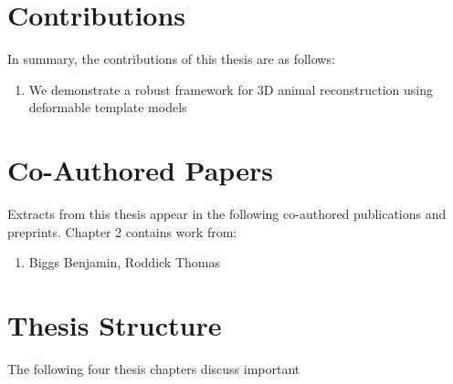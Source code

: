 \section{Contributions}  %
In summary, the contributions of this thesis are as follows:
\begin{enumerate}
    \item We demonstrate a robust framework for 3D animal reconstruction using deformable template models
\end{enumerate}

\section{Co-Authored Papers}  %

Extracts from this thesis appear in the following co-authored publications and preprints. Chapter 2 contains work from:

\begin{enumerate}
    \item Biggs Benjamin, Roddick Thomas
\end{enumerate}

\section{Thesis Structure}  %

The following four thesis chapters discuss important 




